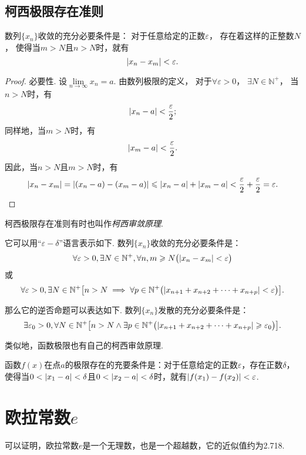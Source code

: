 \subsection{柯西极限存在准则}
\begin{theorem}[柯西极限存在准则]\label{theorem:极限.数列的柯西极限存在准则}
数列\(\{x_n\}\)收敛的充分必要条件是：
对于任意给定的正数\(\varepsilon\)，
存在着这样的正整数\(N\)，
使得当\(m>N\)且\(n>N\)时，就有\[
	\abs{x_n-x_m}<\varepsilon.
\]
\begin{proof}
必要性.
设\(\lim\limits_{n\to\infty}x_n = a\).
由数列极限的定义，
对于\(\forall\varepsilon>0\)，
\(\exists N \in \mathbb{N}^+\)，
当\(n > N\)时，有\[
	\abs{x_n - a} < \frac{\varepsilon}{2};
\]
同样地，当\(m > N\)时，有\[
	\abs{x_m - a} < \frac{\varepsilon}{2}.
\]
因此，当\(n > N\)且\(m > N\)时，有\[
	\abs{x_n - x_m} = \abs{(x_n - a) - (x_m - a)}
	\leqslant \abs{x_n - a} + \abs{x_m - a}
	< \frac{\varepsilon}{2} + \frac{\varepsilon}{2}
	= \varepsilon.
	\qedhere
\]
\end{proof}
\end{theorem}
柯西极限存在准则有时也叫作\emph{柯西审敛原理}.

它可以用“\(\varepsilon-\delta\)”语言表示如下.
数列\(\{x_n\}\)收敛的充分必要条件是：\[
\forall\varepsilon>0,
\exists N\in\mathbb{N}^+,
\forall n,m \geqslant N
\bigl(
	\abs{x_n-x_m}<\varepsilon
\bigr)
\]或\[
\forall\varepsilon>0,
\exists N\in\mathbb{N}^+
\bigl[
	n>N
	\implies
	\forall p\in\mathbb{N}^+
	\bigl(
		\abs{x_{n+1} + x_{n+2} + \dotsb + x_{n+p}} < \varepsilon
	\bigr)
\bigr].
\]

那么它的逆否命题可以表达如下.
数列\(\{x_n\}\)发散的充分必要条件是：\[
\exists\varepsilon_0>0,\forall N\in\mathbb{N}^+ \bigl[
	n > N
	\land
	\exists p\in\mathbb{N}^+ \bigl(
		\abs{x_{n+1} + x_{n+2} + \dotsb + x_{n+p}} \geqslant \varepsilon_0
	\bigr)
\bigr].
\]

类似地，函数极限也有自己的柯西审敛原理.
\begin{theorem}\label{theorem:极限.函数的柯西极限存在准则}
函数\(f(x)\)在点\(a\)的极限存在的充要条件是：对于任意给定的正数\(\varepsilon\)，存在正数\(\delta\)，使得当\(0 < \abs{x_1 - a} < \delta\)且\(0 < \abs{x_2 - a} < \delta\)时，就有\(\abs{f(x_1) - f(x_2)} < \varepsilon\).
\end{theorem}

\section{欧拉常数\texorpdfstring{\(e\)}{e}}
可以证明，欧拉常数\(e\)是一个无理数，也是一个超越数，它的近似值约为2.718.

